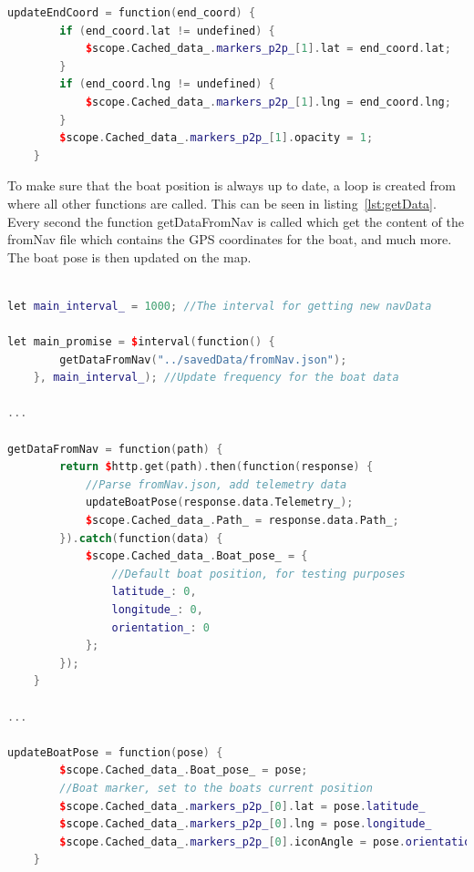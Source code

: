 \begin{lstlisting}[caption = {updateEndCoord in p2p.js}, captionpos=b, label={lst:updateendcoord}, language=C++,firstnumber=1]
updateEndCoord = function(end_coord) {
        if (end_coord.lat != undefined) {
            $scope.Cached_data_.markers_p2p_[1].lat = end_coord.lat;
        }
        if (end_coord.lng != undefined) {
            $scope.Cached_data_.markers_p2p_[1].lng = end_coord.lng;
        }
        $scope.Cached_data_.markers_p2p_[1].opacity = 1;
    }
\end{lstlisting}

To make sure that the boat position is always up to date, a loop is created from where all other functions are called. This can be seen in listing~\ref{lst:getData}. Every second the function getDataFromNav is called which get the content of the fromNav file which contains the GPS coordinates for the boat, and much more. The boat pose is then updated on the map.

\begin{lstlisting}[caption = {Updating the boat pose in p2p.js}, captionpos=b, label={lst:getData}, language=C++,firstnumber=1]

let main_interval_ = 1000; //The interval for getting new navData

let main_promise = $interval(function() {
        getDataFromNav("../savedData/fromNav.json");
    }, main_interval_); //Update frequency for the boat data

...

getDataFromNav = function(path) {
        return $http.get(path).then(function(response) {
            //Parse fromNav.json, add telemetry data
            updateBoatPose(response.data.Telemetry_);
            $scope.Cached_data_.Path_ = response.data.Path_;
        }).catch(function(data) {
            $scope.Cached_data_.Boat_pose_ = {
                //Default boat position, for testing purposes
                latitude_: 0,
                longitude_: 0,
                orientation_: 0
            };
        });
    }
    
...

updateBoatPose = function(pose) {
        $scope.Cached_data_.Boat_pose_ = pose;
        //Boat marker, set to the boats current position
        $scope.Cached_data_.markers_p2p_[0].lat = pose.latitude_
        $scope.Cached_data_.markers_p2p_[0].lng = pose.longitude_
        $scope.Cached_data_.markers_p2p_[0].iconAngle = pose.orientation_
    }
\end{lstlisting}

